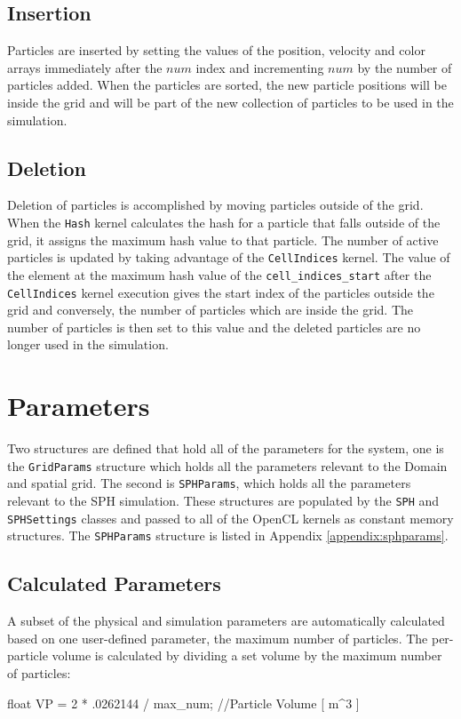\subsection{Insertion}
Particles are inserted by setting the values of the position, velocity and
color arrays immediately after the $num$ index and incrementing $num$ by the
number of particles added. When the particles are sorted, the new particle
positions will be inside the grid and will be part of the new collection of
particles to be used in the simulation.

\subsection{Deletion}
Deletion of particles is accomplished by moving particles outside of the grid.
When the \verb|Hash| kernel calculates the hash for a particle that falls
outside of the grid, it assigns the maximum hash value to that particle.
The number of active particles is updated by taking advantage of the
\verb|CellIndices| kernel. The value of the element at the maximum hash value
of the \verb|cell_indices_start| after the \verb|CellIndices| kernel execution
gives the start index of the particles outside the grid and conversely, the
number of particles which are inside the grid. The number of particles is then
set to this value and the deleted particles are no longer used in the
simulation.

\section{Parameters}
Two structures are defined that hold all of the parameters for the system,
one is the \verb|GridParams| structure which holds all the parameters relevant
to the Domain and spatial grid. The second is \verb|SPHParams|, which holds
all the parameters relevant to the SPH simulation. These structures are
populated by the \verb|SPH| and \verb|SPHSettings| classes and passed to all of
the OpenCL kernels as constant memory structures. The \verb|SPHParams|
structure is listed in Appendix \ref{appendix:sphparams}.


\subsection{Calculated Parameters}
A subset of the physical and simulation parameters are automatically calculated
based on one user-defined parameter, the maximum number of particles. The
per-particle volume is calculated by dividing a set volume by the maximum
number of particles:
\begin{cppcode}{0}
float VP = 2 * .0262144 / max_num;              //Particle Volume [ m^3 ]
\end{cppcode}

